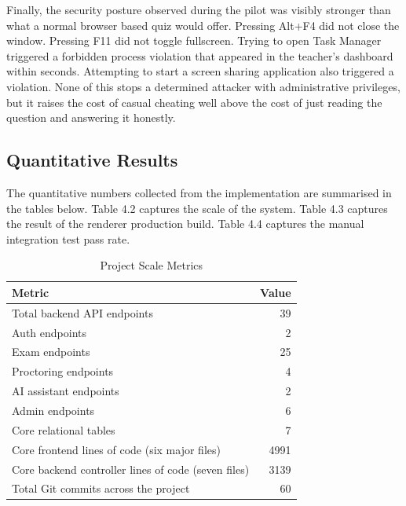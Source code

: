 \documentclass[12pt, a4paper]{report}
\begin{document}
\begin{justify}
{    Finally, the security posture observed during the pilot was visibly stronger than what a normal browser based quiz would offer. Pressing Alt+F4 did not close the window. Pressing F11 did not toggle fullscreen. Trying to open Task Manager triggered a forbidden process violation that appeared in the teacher's dashboard within seconds. Attempting to start a screen sharing application also triggered a violation. None of this stops a determined attacker with administrative privileges, but it raises the cost of casual cheating well above the cost of just reading the question and answering it honestly.
  }
\end{justify}

\subsection{Quantitative Results}

\begin{justify}
  {\fontsize{12}{18}\selectfont
    The quantitative numbers collected from the implementation are summarised in the tables below. Table 4.2 captures the scale of the system. Table 4.3 captures the result of the renderer production build. Table 4.4 captures the manual integration test pass rate.
  }
\end{justify}

\begin{table}[H]
  \caption{Project Scale Metrics}
  \label{tab:4.2}
  \centering
  {\fontsize{11}{14}\selectfont
    \begin{tabular}{|p{3in}|r|}
      \hline
      \textbf{Metric} & \textbf{Value} \\
      \hline
      Total backend API endpoints & 39 \\
      \hline
      Auth endpoints & 2 \\
      \hline
      Exam endpoints & 25 \\
      \hline
      Proctoring endpoints & 4 \\
      \hline
      AI assistant endpoints & 2 \\
      \hline
      Admin endpoints & 6 \\
      \hline
      Core relational tables & 7 \\
      \hline
      Core frontend lines of code (six major files) & 4991 \\
      \hline
      Core backend controller lines of code (seven files) & 3139 \\
      \hline
      Total Git commits across the project & 60 \\
      \hline
    \end{tabular}
  }
\end{table}
\end{document}
